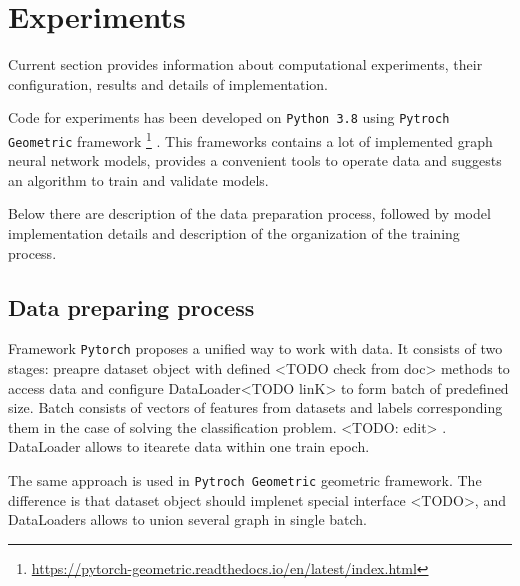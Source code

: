 \section{Experiments}
\label{sec:experiments}


Current section provides information about computational experiments, their configuration, results and details
of implementation.

Code for experiments has been developed on \texttt{Python 3.8} using \texttt{Pytroch Geometric} framework
\footnote{\url{https://pytorch-geometric.readthedocs.io/en/latest/index.html}}
\cite{PyG}.
This frameworks contains a lot of implemented graph neural network models,
provides a convenient tools to operate data and suggests an algorithm to train and validate models.

Below there are description of the data preparation process, followed by model implementation details and description
of the organization of the training process.



\subsection{Data preparing process}

Framework \texttt{Pytorch} proposes a unified way to work with data.
It consists of two stages:
preapre dataset object with defined <TODO check from doc> methods to access data and configure DataLoader<TODO linK>
to form batch of predefined size. Batch consists of vectors of features from datasets and labels corresponding them
in the case of solving the classification problem. <TODO: edit> . DataLoader allows to
itearete data within one train epoch.

The same approach is used in \texttt{Pytroch Geometric} geometric framework. The difference is that
dataset object should implenet special interface <TODO>, and DataLoaders allows to union several graph in single batch.


